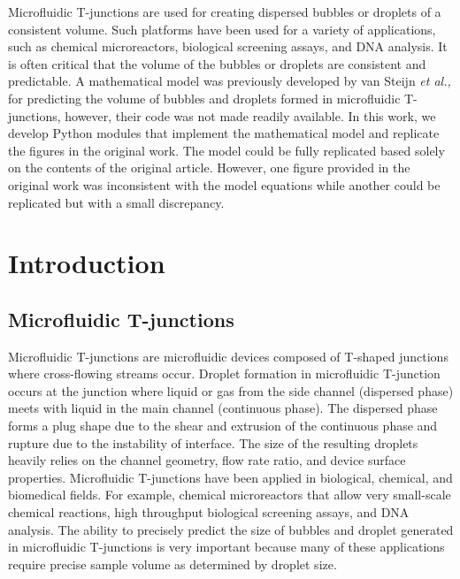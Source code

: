 \noindent
Microfluidic T-junctions are used for creating dispersed bubbles or droplets
of a consistent volume. Such platforms have been used for a variety of applications,
such as chemical microreactors, biological screening assays, and DNA analysis.
It is often critical that the volume of the
bubbles or droplets are consistent and predictable. A mathematical model was
previously developed by van Steijn \emph{et al.,} for predicting the volume of bubbles and droplets formed in
microfluidic T-junctions, however, their code was not made readily available.
In this work, we develop Python modules that implement the mathematical model and 
replicate the figures in the original work. The model
could be fully replicated based solely on the contents of the original article.
However, one figure provided in the original work was inconsistent with the
model equations while another could be replicated but with a small discrepancy.

\section{Introduction}

\subsection{Microfluidic T-junctions}

Microfluidic T-junctions are microfluidic devices composed of T-shaped junctions
where cross-flowing streams occur. Droplet formation in microfluidic T-junction
occurs at the junction where liquid or gas from the side channel (dispersed phase)
meets with liquid in the main channel (continuous phase). The dispersed phase forms
a plug shape due to the shear and extrusion of the continuous phase and rupture due
to the instability of interface\supercite{huang_precise_2020}. The size of the
resulting droplets heavily relies on the channel geometry, flow rate ratio, and device
surface properties\supercite{dreyfus_ordered_2003}. Microfluidic T-junctions have been
applied in biological, chemical, and biomedical
fields\supercite{casadevall_i_solvas_droplet_2011}.
For example, chemical microreactors that allow very small-scale chemical reactions, high
throughput biological screening assays, and DNA analysis\supercite{ibrahim_modeling_2021}.
The ability to precisely predict the size of bubbles and droplet generated in microfluidic
T-junctions is very important because many of these applications require
precise sample volume as determined by droplet size.

